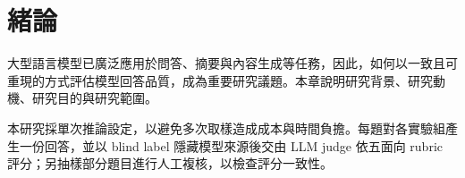 \chapter{緒論}

大型語言模型已廣泛應用於問答、摘要與內容生成等任務，因此，如何以一致且可重現的方式評估模型回答品質，成為重要研究議題。本章說明研究背景、研究動機、研究目的與研究範圍。

本研究採單次推論設定，以避免多次取樣造成成本與時間負擔。每題對各實驗組產生一份回答，並以 blind label 隱藏模型來源後交由 LLM judge 依五面向 rubric 評分；另抽樣部分題目進行人工複核，以檢查評分一致性。
